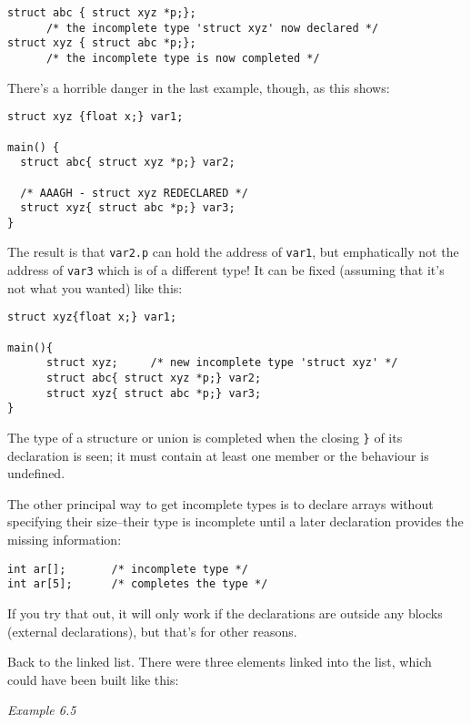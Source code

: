    \begin{Verbatim}
struct abc { struct xyz *p;};
      /* the incomplete type 'struct xyz' now declared */
struct xyz { struct abc *p;};
      /* the incomplete type is now completed */
\end{Verbatim}

   There's a horrible danger in the last example, though, as this shows:


   \begin{Verbatim}
struct xyz {float x;} var1;

main() {
  struct abc{ struct xyz *p;} var2;

  /* AAAGH - struct xyz REDECLARED */
  struct xyz{ struct abc *p;} var3;
}
\end{Verbatim}

   The result is that \texttt{var2.p} can hold the address of
    \texttt{var1}, but emphatically not the address of \texttt{var3}
    which is of a different type! It can be fixed (assuming that it's not what
    you wanted) like this:


   \begin{Verbatim}
struct xyz{float x;} var1;

main(){
      struct xyz;     /* new incomplete type 'struct xyz' */
      struct abc{ struct xyz *p;} var2;
      struct xyz{ struct abc *p;} var3;
}
\end{Verbatim}

   The type of a structure or union is completed when the closing \texttt{\}} of its
    declaration is seen; it must contain at least one member or the behaviour
    is undefined.


   The other principal way to get incomplete types is to declare arrays
    without specifying their size--their type is incomplete until a later
    declaration provides the missing information:


   \begin{Verbatim}
int ar[];       /* incomplete type */
int ar[5];      /* completes the type */
\end{Verbatim}

   If you try that out, it will only work if the declarations are outside
    any blocks (external declarations), but that's for other reasons.


   Back to the linked list. There were three elements linked into the list,
    which could have been built like this:


    \begin{center}\textit{Example 6.5}\end{center}


